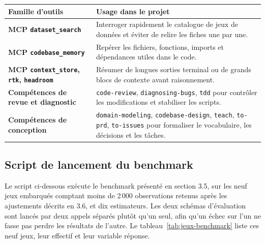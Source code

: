 \documentclass[11pt,a4paper]{article}
\begin{document}
\begin{center}
\small
\begin{tabularx}{\textwidth}{>{\bfseries}p{3.5cm}X}
\toprule
Famille d'outils & Usage dans le projet \\
\midrule
MCP \texttt{dataset\_search} & Interroger rapidement le catalogue de jeux de données et éviter de relire les fiches une par une. \\
MCP \texttt{codebase\_memory} & Repérer les fichiers, fonctions, imports et dépendances utiles dans le code. \\
MCP \texttt{context\_store}, \texttt{rtk}, \texttt{headroom} & Résumer de longues sorties terminal ou de grands blocs de contexte avant raisonnement. \\
Compétences de revue et diagnostic & \texttt{code-review}, \texttt{diagnosing-bugs}, \texttt{tdd} pour contrôler les modifications et stabiliser les scripts. \\
Compétences de conception & \texttt{domain-modeling}, \texttt{codebase-design}, \texttt{teach}, \texttt{to-prd}, \texttt{to-issues} pour formaliser le vocabulaire, les décisions et les tâches. \\
\bottomrule
\end{tabularx}
\end{center}

\subsection{Script de lancement du benchmark}
\label{annexe:benchmark-script}

Le script ci-dessous exécute le benchmark présenté en section 3.5, sur les neuf jeux embarqués comptant moins de 2\,000 observations retenus après les ajustements décrits en 3.6, et dix estimateurs. Les deux schémas d'évaluation sont lancés par deux appels séparés plutôt qu'un seul, afin qu'un échec sur l'un ne fasse pas perdre les résultats de l'autre. Le tableau~\ref{tab:jeux-benchmark} liste ces neuf jeux, leur effectif et leur variable réponse.
\end{document}
